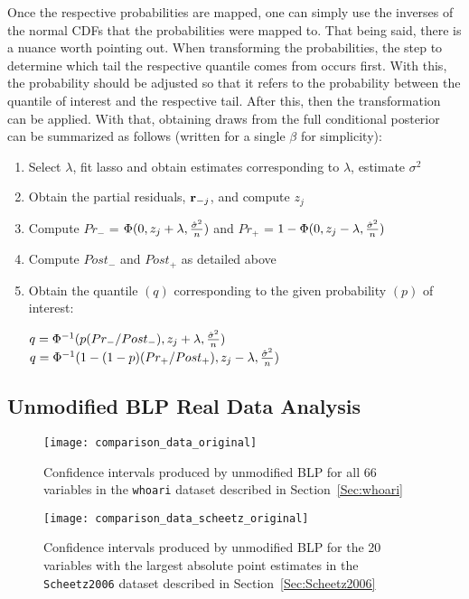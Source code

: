 

Once the respective probabilities are mapped, one can simply use the inverses of the normal CDFs that the probabilities were mapped to. That being said, there is a nuance worth pointing out. When transforming the probabilities, the step to determine which tail the respective quantile comes from occurs first. With this, the probability should be adjusted so that it refers to the probability between the quantile of interest and the respective tail. After this, then the transformation can be applied. With that, obtaining draws from the full conditional posterior can be summarized as follows (written for a single $\beta$ for simplicity):

\begin{enumerate}
  \item Select $\lambda$, fit lasso and obtain estimates corresponding to $\lambda$, estimate $\sigma^2$
	\item Obtain the partial residuals, $\mathbf{r}_{-j}$, and compute $z_j$
	\item Compute $Pr_{-}$ = $\Phi(0, z_j + \lambda, \frac{\hat{\sigma}^2}{n})$ and $Pr_{+}$ = $1 - \Phi(0, z_j - \lambda, \frac{\hat{\sigma}^2}{n})$
	\item Compute $Post_-$ and $Post_+$ as detailed above
	\item Obtain the quantile $(q)$ corresponding to the given probability $(p)$ of interest:
  \begin{algorithmic}
      \State $q = \Phi^{-1}(p(Pr_{-} / Post_{-}), z_j + \lambda, \frac{\hat{\sigma}^2}{n})$
    \Else
        \State $q = \Phi^{-1}(1 - (1 - p)(Pr_{+} / Post_{+}), z_j - \lambda, \frac{\hat{\sigma}^2}{n})$
    \EndIf
  \end{algorithmic}
\end{enumerate}
  
\subsection{Unmodified BLP Real Data Analysis}\label{Sec:Unmodified}

\begin{figure}[hbtp]
  \texttt{[image: comparison\_data\_original]}
  \caption{\label{Fig:comparison_data_whoari_original} Confidence intervals produced by unmodified BLP for all 66 variables in the \texttt{whoari} dataset described in Section~\ref{Sec:whoari}}
\end{figure}

\begin{figure}[hbtp]
  \texttt{[image: comparison\_data\_scheetz\_original]}
  \caption{\label{Fig:comparison_data_scheetz_original} Confidence intervals produced by unmodified BLP for the 20 variables with the largest absolute point estimates in the \texttt{Scheetz2006} dataset described in Section~\ref{Sec:Scheetz2006}}
\end{figure}

\newpage